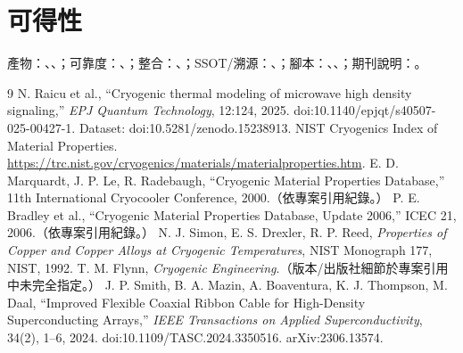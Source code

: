 \documentclass[11pt,a4paper]{article}
\begin{document}
\section*{可得性}
產物：、、；可靠度：、；整合：、；SSOT/溯源：、；腳本：、、；期刊說明：。

\begin{thebibliography}{9}
 N. Raicu et al., ``Cryogenic thermal modeling of microwave high density signaling,'' \textit{EPJ Quantum Technology}, 12:124, 2025. doi:10.1140/epjqt/s40507-025-00427-1. Dataset: doi:10.5281/zenodo.15238913.
 NIST Cryogenics Index of Material Properties. \url{https://trc.nist.gov/cryogenics/materials/materialproperties.htm}.
 E. D. Marquardt, J. P. Le, R. Radebaugh, ``Cryogenic Material Properties Database,'' 11th International Cryocooler Conference, 2000.（依專案引用紀錄。）
 P. E. Bradley et al., ``Cryogenic Material Properties Database, Update 2006,'' ICEC 21, 2006.（依專案引用紀錄。）
 N. J. Simon, E. S. Drexler, R. P. Reed, \textit{Properties of Copper and Copper Alloys at Cryogenic Temperatures}, NIST Monograph 177, NIST, 1992.
 T. M. Flynn, \textit{Cryogenic Engineering}.（版本/出版社細節於專案引用中未完全指定。）
 J. P. Smith, B. A. Mazin, A. Boaventura, K. J. Thompson, M. Daal, ``Improved Flexible Coaxial Ribbon Cable for High-Density Superconducting Arrays,'' \textit{IEEE Transactions on Applied Superconductivity}, 34(2), 1--6, 2024. doi:10.1109/TASC.2024.3350516. arXiv:2306.13574.
\end{thebibliography}
\end{document}
